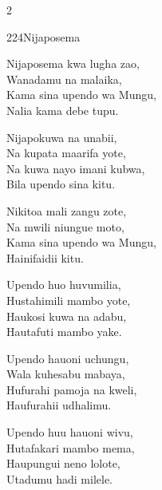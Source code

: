 \documentclass{article}
\begin{document}
\begin{multicols}{2}
\begin{hymn}{224}{Nijaposema}{}
\begin{stanza}
Nijaposema kwa lugha zao,\\
Wanadamu na malaika,\\
Kama sina upendo wa Mungu,\\
Nalia kama debe tupu.
\end{stanza}
\begin{stanza}
Nijapokuwa na unabii,\\
Na kupata maarifa yote,\\
Na kuwa nayo imani kubwa,\\
Bila upendo sina kitu.
\end{stanza}
\begin{stanza}
Nikitoa mali zangu zote,\\
Na mwili niungue moto,\\
Kama sina upendo wa Mungu,\\
Hainifaidii kitu.
\end{stanza}
\begin{stanza}
Upendo huo huvumilia,\\
Hustahimili mambo yote,\\
Haukosi kuwa na adabu,\\
Hautafuti mambo yake.
\end{stanza}
\begin{stanza}
Upendo hauoni uchungu,\\
Wala kuhesabu mabaya,\\
Hufurahi pamoja na kweli,\\
Haufurahii udhalimu.
\end{stanza}
\begin{stanza}
Upendo huu hauoni wivu,\\
Hutafakari mambo mema,\\
Haupungui neno lolote,\\
Utadumu hadi milele.
\end{stanza}
\end{hymn}


\end{multicols}
\end{document}
